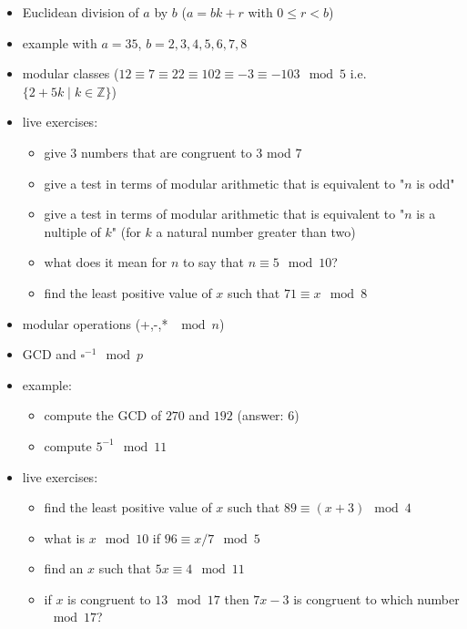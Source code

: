 \documentclass[a4paper,12pt]{article}
\providecommand{\tightlist}{\setlength{\itemsep}{0pt}\setlength{\parskip}{0pt}}
\newcommand{\Z}{\mathbb{Z}}
\begin{document}
	\begin{itemize}
	\tightlist
	\item
	Euclidean division of \(a\) by \(b\) (\(a=bk+r\) with
	\(0 \leq r < b\))
	\item
	example with \(a=35\), \(b=2,3,4,5,6,7,8\)
	\item
	modular classes
	(\(12 \equiv 7 \equiv 22 \equiv 102 \equiv -3 \equiv -103 \mod 5\)
	i.e. \(\{2+5k \mid k \in \Z \}\))
	\item
	live exercises:
	
	\begin{itemize}
		\tightlist
		\item
		give 3 numbers that are congruent to 3 mod 7
		\item
		give a test in terms of modular arithmetic that is equivalent to
		"\(n\) is odd"
		\item
		give a test in terms of modular arithmetic that is equivalent to
		"\(n\) is a nultiple of \(k\)" (for \(k\) a natural number greater
		than two)
		\item
		what does it mean for \(n\) to say that \(n \equiv 5 \mod 10\)?
		\item
		find the least positive value of \(x\) such that
		\(71 \equiv x \mod 8\)
	\end{itemize}
	\item
	modular operations (+,-,* \(\mod n\))
	\item
	GCD and \(\square^{-1} \mod p\)
	\item
	example:
	
	\begin{itemize}
		\tightlist
		\item
		compute the GCD of \(270\) and \(192\) (answer: \(6\))
		\item
		compute \(5^{-1} \mod 11\)
	\end{itemize}
	\item
	live exercises:
	
	\begin{itemize}
		\tightlist
		\item
		find the least positive value of \(x\) such that
		\(89 \equiv (x + 3) \mod 4\)
		\item
		what is \(x \mod 10\) if \(96 \equiv x / 7 \mod 5\)
		\item
		find an \(x\) such that \(5x \equiv 4 \mod 11\)
		\item
		if \(x\) is congruent to \(13 \mod 17\) then \(7x - 3\) is congruent
		to which number \(\mod 17\)?
	\end{itemize}
	\end{itemize}
	
	
	
\end{document}
